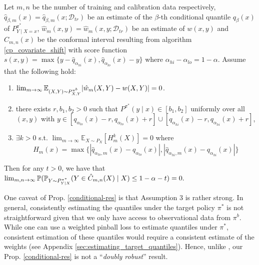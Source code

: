 \begin{proposition}\label{conditional-res}
Let $m, n$ be the number of training and calibration data respectively, $\hat{q}_{\beta, m} (x)= \hat{q}_{\beta, m} (x; \mathcal{D}_{tr})$ be an estimate of the $\beta$-th conditional quantile $q_\beta (x)$ of $P^{\pi^*}_{Y \mid X=x}$, $\hat{w}_m(x, y) = \hat{w}_m(x, y; \mathcal{D}_{tr})$ be an estimate of $w(x,y)$ and $\hat{C}_{m,n}(x)$ be the conformal interval resulting from algorithm \ref{cp_covariate_shift} with score function $s(x, y) = \max \{y - \hat{q}_{\alpha_{hi}} (x), \hat{q}_{\alpha_{lo}} (x) - y \}$ where $\alpha_{hi} - \alpha_{lo} = 1 - \alpha$. Assume that the following hold:
\begin{enumerate}
    \item $\lim_{m \rightarrow \infty} \mathbb{E}_{(X,Y)\sim P^{\pi^b}_{X,Y}} |\hat{w}_{m}(X, Y) -  w(X, Y)|  = 0$.
    \item there exists $r, b_1, b_2 > 0$ such that $P^{\pi^*}(y \mid x) \in [b_1, b_2]$ uniformly over all $(x, y)$ with $y \in [q_{\alpha_{lo}}(x) - r, q_{\alpha_{lo}}(x) + r] \cup [q_{\alpha_{hi}}(x) - r, q_{\alpha_{hi}}(x) + r]$,
    \item  $\exists k > 0$ s.t. $\lim_{m\rightarrow\infty} \mathbb{E}_{X\sim P_X}[H^k_{m}(X)] = 0$
    where $$H_m(x) = \max\{|\hat{q}_{\alpha_{lo}, m}(x) - q_{\alpha_{lo}}(x)|, |\hat{q}_{\alpha_{hi}, m}(x) - q_{\alpha_{hi}}(x)|\}$$
\end{enumerate}
Then for any $t > 0$, we have that $ \lim_{m, n \rightarrow \infty} \mathbb{P}(\mathbb{P}_{Y \sim P^{\pi^*}_{Y\mid X} }(Y\in \hat{C}_{m, n}(X) \mid X) \leq 1 - \alpha - t) = 0.$
\end{proposition}

One caveat of Prop. \ref{conditional-res} is that Assumption 3 is rather strong. In general, consistently estimating the quantiles under the target policy $\pi^*$ is not straightforward given that we only have access to observational data from $\pi^b$. While one can use a weighted pinball loss to estimate quantiles under $\pi^*$, consistent estimation of these quantiles would require a consistent estimate of the weights (see Appendix  \ref{sec:estimating_target_quantiles}). Hence, unlike \cite[Theorem 1]{lei2020conformal}, our Prop. \ref{conditional-res} is not a ``\textit{doubly robust}'' result.

